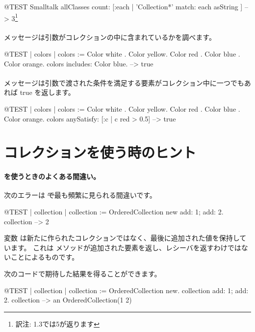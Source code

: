 \documentclass[a4paper,10pt,twoside]{book}
\begin{document}
\begin{code}{@TEST}
Smalltalk allClasses count: [:each | 'Collection*' match: each asString ] --> 3\footnote{訳注: \pharo 1.3では5が返ります}
\end{code}

\paragraph{}   メッセージは引数がコレクションの中に含まれているかを調べます。

\begin{code}{@TEST | colors |}
colors := {Color white . Color yellow. Color red . Color blue . Color orange}.
colors includes: Color blue. --> true
\end{code}

\paragraph{}   メッセージは引数で渡された条件を満足する要素がコレクション中に一つでもあれば true を返します。

\begin{code}{@TEST | colors | colors := {Color white . Color yellow. Color red . Color blue . Color orange}.}
colors anySatisfy: [:c | c red > 0.5] --> true
\end{code}
\section{コレクションを使う時のヒント}

\paragraph{ を使うときのよくある間違い。} 次のエラーは \st で最も頻繁に見られる間違いです。

\begin{code}{@TEST | collection | }
collection := OrderedCollection new add: 1; add: 2.
collection --> 2
\end{code}
\noindent
変数  は新たに作られたコレクションではなく、最後に追加された値を保持しています。
これは メソッドが追加された要素を返し、レシーバを返すわけではないことによるものです。

次のコードで期待した結果を得ることができます。
\begin{code}{@TEST | collection |}
collection := OrderedCollection new.
collection add: 1; add: 2.
collection --> an OrderedCollection(1 2)
\end{code}
\end{document}

